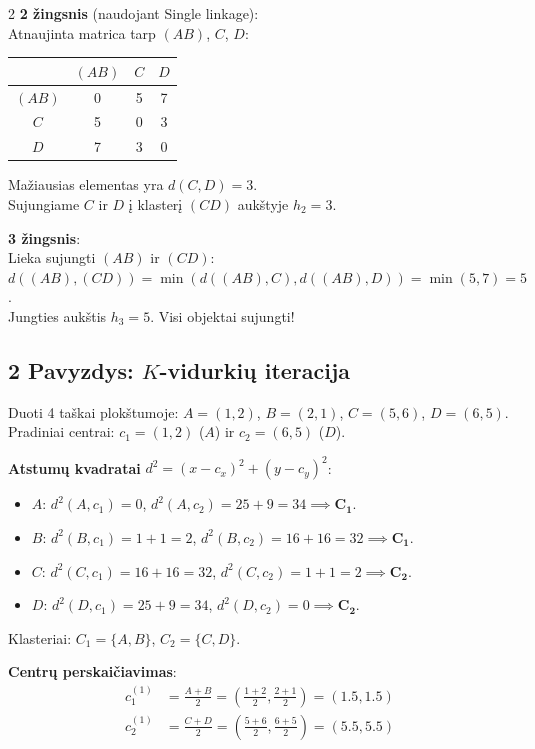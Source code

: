 \documentclass[9pt,a4paper]{article}
\begin{document}
\begin{multicols*}{2}
\textbf{2 žingsnis} (naudojant Single linkage):\\
Atnaujinta matrica tarp $(AB)$, $C$, $D$:
\begin{center}
\begin{tabular}{c|ccc}
 & $(AB)$ & $C$ & $D$ \\
\hline
$(AB)$ & 0 & 5 & 7 \\
$C$ & 5 & 0 & 3 \\
$D$ & 7 & 3 & 0 \\
\end{tabular}
\end{center}
Mažiausias elementas yra $d(C, D) = 3$.\\
Sujungiame $C$ ir $D$ į klasterį $(CD)$ aukštyje $h_2 = 3$.

\textbf{3 žingsnis}:\\
Lieka sujungti $(AB)$ ir $(CD)$:\\
$d((AB), (CD)) = \min(d((AB), C), d((AB), D)) = \min(5, 7) = 5$.\\
Jungties aukštis $h_3 = 5$. Visi objektai sujungti!

\subsection{2 Pavyzdys: $K$-vidurkių iteracija}
Duoti 4 taškai plokštumoje:
$A=(1, 2)$, $B=(2, 1)$, $C=(5, 6)$, $D=(6, 5)$.\\
Pradiniai centrai: $c_1 = (1, 2)$ ($A$) ir $c_2 = (6, 5)$ ($D$).

\textbf{Atstumų kvadratai} $d^2 = (x - c_x)^2 + (y - c_y)^2$:
\begin{itemize}
    \item $A$: $d^2(A, c_1) = 0$, $d^2(A, c_2) = 25 + 9 = 34 \implies \mathbf{C_1}$.
    \item $B$: $d^2(B, c_1) = 1 + 1 = 2$, $d^2(B, c_2) = 16 + 16 = 32 \implies \mathbf{C_1}$.
    \item $C$: $d^2(C, c_1) = 16 + 16 = 32$, $d^2(C, c_2) = 1 + 1 = 2 \implies \mathbf{C_2}$.
    \item $D$: $d^2(D, c_1) = 25 + 9 = 34$, $d^2(D, c_2) = 0 \implies \mathbf{C_2}$.
\end{itemize}
Klasteriai: $C_1 = \{A, B\}$, $C_2 = \{C, D\}$.

\textbf{Centrų perskaičiavimas}:
\begin{align*}
    c_1^{(1)} &= \frac{A + B}{2} = \left(\frac{1+2}{2}, \frac{2+1}{2}\right) = (1.5, 1.5) \\
    c_2^{(1)} &= \frac{C + D}{2} = \left(\frac{5+6}{2}, \frac{6+5}{2}\right) = (5.5, 5.5)
\end{align*}


\end{multicols*}
\end{document}
